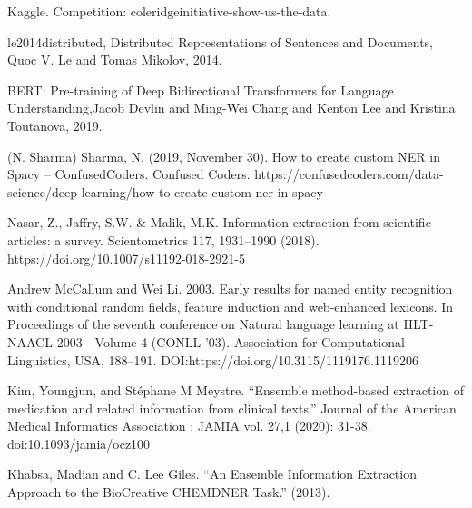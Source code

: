 \documentclass[twocolumn]{article}
\begin{document}
\begin{thebibliography}{12}
Kaggle. Competition: coleridgeinitiative-show-us-the-data.

le2014distributed, Distributed Representations of Sentences and Documents, Quoc V. Le and Tomas Mikolov, 2014.

BERT: Pre-training of Deep Bidirectional Transformers for Language Understanding,Jacob Devlin and Ming-Wei Chang and Kenton Lee and Kristina Toutanova, 2019.

\bibitem(N. Sharma)
Sharma, N. (2019, November 30). How to create custom NER in Spacy – ConfusedCoders. Confused Coders. https://confusedcoders.com/data-science/deep-learning/how-to-create-custom-ner-in-spacy

Nasar, Z., Jaffry, S.W. \& Malik, M.K. Information extraction from scientific articles: a survey. Scientometrics 117, 1931–1990 (2018). https://doi.org/10.1007/s11192-018-2921-5

Andrew McCallum and Wei Li. 2003. Early results for named entity recognition with conditional random fields, feature induction and web-enhanced lexicons. In Proceedings of the seventh conference on Natural language learning at HLT-NAACL 2003 - Volume 4 (CONLL '03). Association for Computational Linguistics, USA, 188–191. DOI:https://doi.org/10.3115/1119176.1119206

Kim, Youngjun, and Stéphane M Meystre. “Ensemble method-based extraction of medication and related information from clinical texts.” Journal of the American Medical Informatics Association : JAMIA vol. 27,1 (2020): 31-38. doi:10.1093/jamia/ocz100

Khabsa, Madian and C. Lee Giles. “An Ensemble Information Extraction Approach to the BioCreative CHEMDNER Task.” (2013).
\end{thebibliography}
\end{document}
